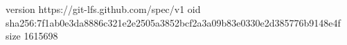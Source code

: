 version https://git-lfs.github.com/spec/v1
oid sha256:7f1ab0e3da8886c321e2e2505a3852bcf2a3a09b83e0330e2d385776b9148e4f
size 1615698
